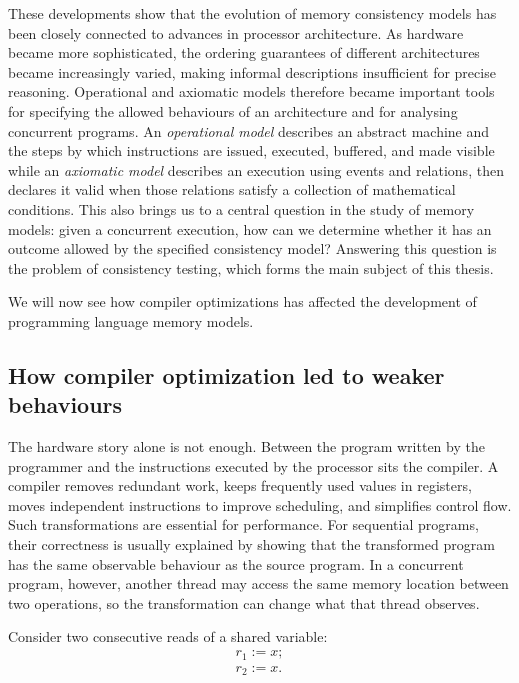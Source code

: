These developments show that the evolution of memory consistency models has been closely connected to advances in processor architecture. As hardware became more sophisticated, the ordering guarantees of different architectures became increasingly varied, making informal descriptions insufficient for precise reasoning. Operational and axiomatic models therefore became important tools for specifying the allowed behaviours of an architecture and for analysing concurrent programs. An \emph{operational model} describes an abstract machine and the steps by which instructions are issued, executed, buffered, and made visible while an \emph{axiomatic model} describes an execution using events and relations, then declares it valid when those relations satisfy a collection of mathematical conditions. This also brings us to a central question in the study of memory models: given a concurrent execution, how can we determine whether it has an outcome allowed by the specified consistency model? Answering this question is the problem of consistency testing, which forms the main subject of this thesis.

We will now see how compiler optimizations has affected the development of programming language memory models.  

\subsection{How compiler optimization led to weaker behaviours}

The hardware story alone is not enough. Between the program written by the programmer and the instructions executed by the processor sits the compiler. A compiler removes redundant work, keeps frequently used values in registers, moves independent instructions to improve scheduling, and simplifies control flow. Such transformations are essential for performance. For sequential programs, their correctness is usually explained by showing that the transformed program has the same observable behaviour as the source program. In a concurrent program, however, another thread may access the same memory location between two operations, so the transformation can change what that thread observes.

Consider two consecutive reads of a shared variable:
\[
\begin{array}{ll}
r_1 := x;\\
r_2 := x.
\end{array}
\]

